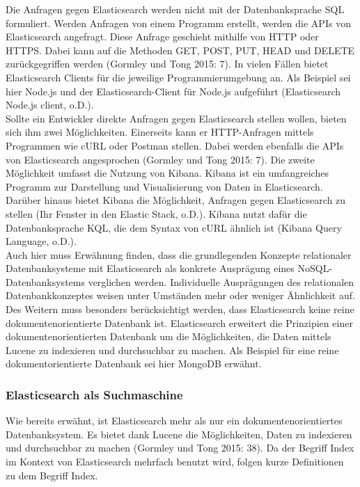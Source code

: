 \documentclass[a4paper]{scrartcl}
\begin{document}
Die Anfragen gegen Elasticsearch werden nicht mit der Datenbanksprache SQL formuliert. Werden Anfragen von einem Programm erstellt, werden die APIs von Elasticsearch angefragt. Diese Anfrage geschieht mithilfe von HTTP oder HTTPS. Dabei kann auf die Methoden GET, POST, PUT, HEAD und DELETE zurückgegriffen werden (Gormley und Tong 2015: 7). In vielen Fällen bietet Elasticsearch Clients für die jeweilige Programmierumgebung an. Als Beispiel sei hier Node.js und der Elasticsearch-Client für Node.js aufgeführt (Elasticsearch Node.js client, o.D.). \\
Sollte ein Entwickler direkte Anfragen gegen Elasticsearch stellen wollen, bieten sich ihm zwei Möglichkeiten. Einerseits kann er HTTP-Anfragen mittels Programmen wie cURL oder Postman stellen. Dabei werden ebenfalls die APIs von Elasticsearch angesprochen (Gormley und Tong 2015: 7). Die zweite Möglichkeit umfasst die Nutzung von Kibana. Kibana ist ein umfangreiches Programm zur Darstellung und Visualisierung von Daten in Elasticsearch. Darüber hinaus bietet Kibana die Möglichkeit, Anfragen gegen Elasticsearch zu stellen (Ihr Fenster in den Elastic Stack, o.D.). Kibana nutzt dafür die Datenbanksprache KQL, die dem Syntax von cURL ähnlich ist (Kibana Query Language, o.D.). \\

Auch hier muss Erwähnung finden, dass die grundlegenden Konzepte relationaler Datenbanksysteme mit Elasticsearch als konkrete Ausprägung eines NoSQL-Datenbanksystems verglichen werden. Individuelle Ausprägungen des relationalen Datenbankkonzeptes weisen unter Umständen mehr oder weniger Ähnlichkeit auf. Des Weitern muss besonders berücksichtigt werden, dass Elasticsearch keine reine dokumentenorientierte Datenbank ist. Elasticsearch erweitert die Prinzipien einer dokumentenorientierten Datenbank um die Möglichkeiten, die Daten mittels Lucene zu indexieren und durchsuchbar zu machen. Als Beispiel für eine reine dokumentorientierte Datenbank sei hier MongoDB erwähnt.

\subsubsection{Elasticsearch als Suchmaschine}
Wie bereits erwähnt, ist Elasticsearch mehr als nur ein dokumentenorientiertes Datenbanksystem. Es bietet dank Lucene die Möglichkeiten, Daten zu indexieren und durchsuchbar zu machen (Gormley und Tong 2015: 38). Da der Begriff Index im Kontext von Elasticsearch mehrfach benutzt wird, folgen kurze Definitionen zu dem Begriff Index.
\end{document}
